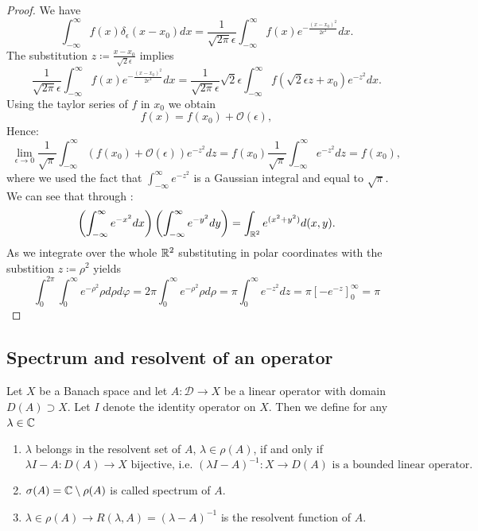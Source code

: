 {\color{gray}
\begin{proof}
	We have
	\[ \int_{-\infty}^{\infty} f(x) \delta_{\epsilon}(x-x_{0}) dx = \frac{1}{\sqrt{2\pi} \epsilon} \int_{-\infty}^{\infty} f(x) e^{-\frac{(x - x_{0})^{2}}{2 \epsilon^{2}}} dx. \] 
	The substitution $z \coloneqq \frac{x - x_{0}}{\sqrt{2} \epsilon}$ implies 
	\[ \frac{1}{\sqrt{2\pi} \epsilon} \int_{-\infty}^{\infty} f(x) e^{-\frac{(x - x_{0})^{2}}{2 \epsilon^{2}}} dx = \frac{1}{\sqrt{2\pi} \epsilon} \sqrt{2} \epsilon \int_{-\infty}^{\infty} f(\sqrt{2} \epsilon z + x_{0}) e^{-z^{2}} dx. \]
	Using the taylor series of $f$ in $x_{0}$ we obtain
	\[ f(x) = f(x_{0}) + \mathcal{O}(\epsilon), \]
	Hence:
	\[ \lim_{\epsilon \rightarrow 0} \frac{1}{\sqrt{\pi}} \int_{-\infty}^{\infty} (f(x_{0}) + \mathcal{O}(\epsilon)) e^{-z^{2}} dz = f(x_{0}) \frac{1}{\sqrt{\pi}} \int_{-\infty}^{\infty} e^{-z^{2}} dz = f(x_{0}), \]
	where we used the fact that $\int_{-\infty}^{\infty} e^{-z^{2}}$ is a Gaussian integral and equal to $\sqrt{\pi}$. We can see that through :
	\[ \left( \int_{-\infty}^{\infty} e^{-x^{2}} dx \right) \left( \int_{-\infty}^{\infty} e^{-y^{2}} dy \right) = \int_{\mathbb{R}^{2}} e^{(x^{2} + y^{2})} d(x, y). \] 
	As we integrate over the whole $\mathbb{R}^{2}$ substituting in polar coordinates with the substition $z \coloneqq \rho^{2}$ yields
	\[ \int_{0}^{2 \pi} \int_{0}^{\infty} e^{-\rho^{2}} \rho d\rho d\varphi = 2 \pi \int_{0}^{\infty} e^{-\rho^{2}} \rho d\rho = \pi \int_{0}^{\infty} e^{-z^{2}} dz = \pi \left[ -e^{-z} \right]_{0}^{\infty} = \pi \]
\end{proof} }


\subsection*{Spectrum and resolvent of an operator}

Let $X$ be a Banach space and let $A \colon \mathcal{D} \rightarrow X$ be a  linear operator with domain $D(A) \supset X$. Let $I$ denote the identity operator on $X$. Then we define for any $\lambda \in \mathbb{C}$
	\begin{enumerate}[label=\alph*\upshape)]
		\item $\lambda$ belongs in the resolvent set of $A$, $\lambda \in \rho(A)$, if and only if
			\[ \lambda I - A \colon D(A) \rightarrow X \text{ bijective, i.e. } (\lambda I - A)^{-1} \colon X \rightarrow D(A) \text{ is a bounded linear operator.} \]
		\item $\sigma(A) = \mathbb{C} \setminus \rho(A)$ is called spectrum of $A$.
		\item $\lambda \in \rho(A) \rightarrow R(\lambda, A) = (\lambda - A)^{-1}$ is the resolvent function of $A$.
	\end{enumerate}	
	
